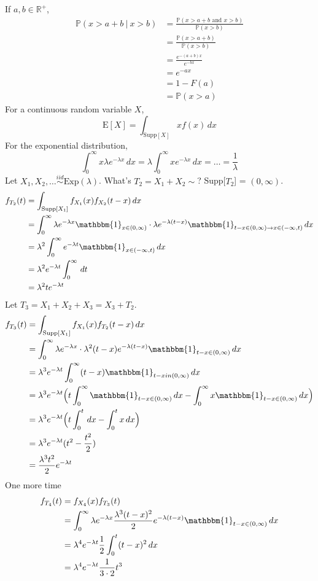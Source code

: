 \documentclass[12pt]{article}
\newcommand{\prob}[1]{\mathbb{P}(#1)}
\newcommand{\cprob}[2]{\mathbb{P}(#1 ~|~ #2)}
\newcommand{\indicator}[1]{\mathbbm{1}_{#1}}
\newcommand{\iid}{\stackrel{iid}{\sim}}
\newcommand{\expected}[1]{\mathrm{E}[#1]}
\begin{document}
If $a, b \in \mathbb{R}^+$, $$\begin{aligned} \cprob{x > a + b}{x > b} &= \frac{\prob{x > a +b \text{ and } x > b}}{\prob{x > b}} \\ &= \frac{\prob{x > a + b}}{\prob{x > b}} \\ &= \frac{e^{-(a + b)x}}{e^{-bx}} \\ &= e^{-ax} \\ &= 1 - F(a) \\ &= \prob{x > a} \end{aligned} $$ 
For a continuous random variable $X$, $$\expected{X} = \int_{\text{Supp}[X]} xf(x)\, dx $$ For the exponential distribution, $$\int_0^{\infty} x\lambda e^{-\lambda x} \, dx = \lambda \int_0^{\infty} xe^{-\lambda x} \, dx = \dots = \frac{1}{\lambda} $$ 
Let $X_1, X_2, \dots \iid \text{Exp}(\lambda)$. What's $T_2 = X_1 + X_2 \sim $? Supp[$T_2$] = $(0, \infty)$. $$\begin{aligned} f_{T_2}(t) &= \int_{\text{Supp}[X_1]} f_{X_1}(x)f_{X_2}(t - x) \, dx \\ &= \int_0^{\infty} \lambda e^{-\lambda x} \indicator{x \in (0, \infty)} \cdot \lambda e^{-\lambda(t - x)} \indicator{t - x \in (0, \infty) \to x \in (-\infty, t)} \, dx \\ &= \lambda^2 \int_0^{\infty} e^{-\lambda t} \indicator{x \in (-\infty, t)} \, dx \\ &= \lambda^2 e^{-\lambda t} \int_0^{\infty} \, dt \\ &= \lambda^2 te^{-\lambda t} \end{aligned} $$ 
Let $T_3 = X_1 + X_2 + X_3 = X_3 + T_2$. $$\begin{aligned} f_{T_3}(t) &= \int_{\text{Supp}[X_1]} f_{X_1}(x)f_{T_2}(t - x) \, dx \\ &= \int_0^{\infty} \lambda e^{-\lambda x} \cdot \lambda^2 (t - x)e^{-\lambda(t - x)} \indicator{t - x \in (0, \infty)} \, dx \\ &= \lambda^3 e^{-\lambda t} \int_0^{\infty} (t - x) \indicator{t - x in (0, \infty)} \, dx \\ &= \lambda^3 e^{-\lambda t} \Big( t\int_0^{\infty} \indicator{t - x \in (0, \infty)} \, dx - \int_0^{\infty} x \indicator{t - x \in (0, \infty)} \, dx \Big) \\ &= \lambda^3 e^{-\lambda t} \Big( t\int_0^t \, dx - \int_0^t x\, dx \Big) \\ &= \lambda^3 e^{-\lambda t} (t^2 - \frac{t^2}{2}) \\ &= \frac{\lambda^3t^2}{2}e^{-\lambda t} \end{aligned} $$ One more time $$\begin{aligned} 
f_{T_4}(t) &= f_{X_4}(x) f_{T_3}(t) \\ &= \int_0^{\infty} \lambda e^{-\lambda x} \frac{\lambda^3 (t - x)^2}{2} e^{-\lambda(t - x)} \indicator{t - x \in (0, \infty)} \, dx \\ &= \lambda^4 e^{-\lambda t} \frac{1}{2} \int_0^t (t - x)^2 \, dx \\ &= \lambda^4 e^{-\lambda t} \frac{1}{3 \cdot 2} t^3 \end{aligned} $$
\end{document}

